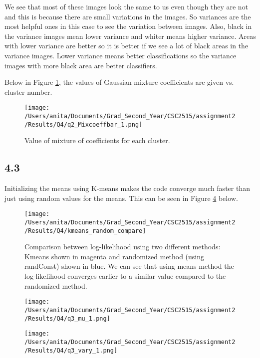 \documentclass[10pt]{article}
\begin{document}
We see that most of these images look the same to us even though they are not and this is because there are small variations in the images. So variances are the most helpful ones in this case to see the variation between images.
Also, black in the variance images mean lower variance and whiter means higher variance. Areas with lower variance are better so it is better if we see a lot of black areas in the variance images. Lower variance means better classifications so the variance images with more black area are better classifiers.

Below in Figure \ref{fig:q4.2_pik}, the values of Gaussian mixture coefficients are given vs. cluster number.
\begin{figure}[H]
	\centering
	\texttt{[image: /Users/anita/Documents/Grad\_Second\_Year/CSC2515/assignment2/Results/Q4/q2\_Mixcoeffbar\_1.png]}
	\caption{Value of mixture of coefficients for each cluster.}
	\label{fig:q4.2_pik}
\end{figure}


\subsection*{4.3}
Initializing the means using K-means makes the code converge much faster than just using random values for the means.
This can be seen in Figure \ref{fig:q4.3_mu} below.

\begin{figure}[H]
	\centering
	\texttt{[image: /Users/anita/Documents/Grad\_Second\_Year/CSC2515/assignment2/Results/Q4/kmeans\_random\_compare]}
	\caption{Comparison between log-likelihood using two different methods: Kmeans shown in magenta and randomized method (using randConst) shown in blue.
	We can see that using means method the log-likelihood converges earlier to a similar value compared to the randomized method.}
	\label{fig:q4.3_logL}
\end{figure}


\begin{figure}[H]
	\centering
	\texttt{[image: /Users/anita/Documents/Grad\_Second\_Year/CSC2515/assignment2/Results/Q4/q3\_mu\_1.png]}
	\caption{}
	\label{fig:q4.3_mu}
\end{figure}


\begin{figure}[H]
	\centering
	\texttt{[image: /Users/anita/Documents/Grad\_Second\_Year/CSC2515/assignment2/Results/Q4/q3\_vary\_1.png]}
	\caption{}
	\label{fig:q4.3_mu}
\end{figure}
\end{document}
